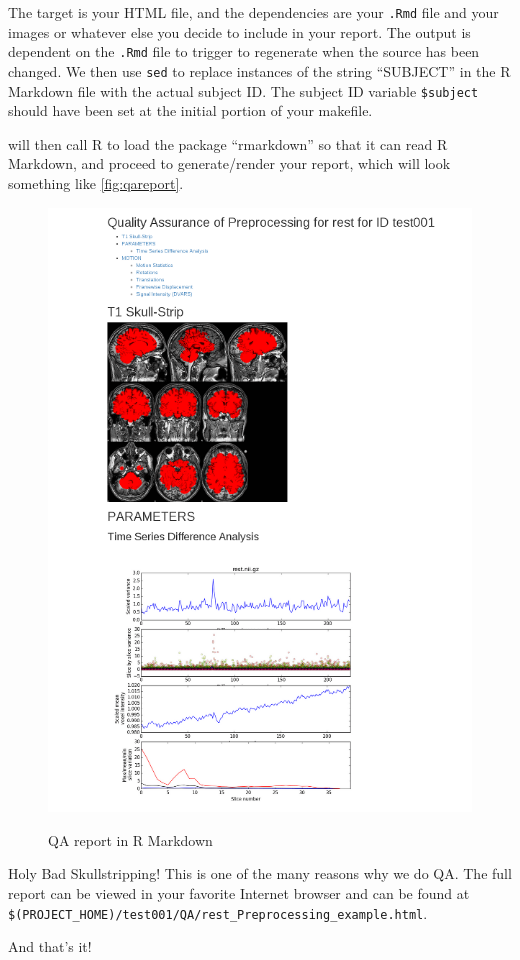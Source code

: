 The target is your HTML file, and the dependencies are your \texttt{.Rmd} file and your images or whatever else you decide to include in your report. The output is dependent on the \texttt{.Rmd} file to trigger to regenerate when the source has been changed. We then use \texttt{sed} to replace instances of the string ``SUBJECT'' in the R Markdown file with the actual subject ID. The subject ID variable \texttt{\$subject} should have been set at the initial portion of your makefile. 

\maken{} will then call R to load the package ``rmarkdown'' so that it can read R Markdown, and proceed to generate/render your report, which will look something like \autoref{fig:qareport}. 

\begin{figure}
	\begin{center}
		\includegraphics[scale=.6]{images/QAcropped.png}
                \label{fig:qareport}
		\caption{QA report in R Markdown}
	\end{center}
\end{figure}

Holy Bad Skullstripping! This is one of the many reasons why we do QA. The full report can be viewed in your favorite Internet browser and can be found at \texttt{\$(PROJECT\_HOME)/test001/QA/rest\_Preprocessing\_example.html}. 
 
And that's it! 






